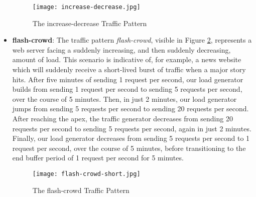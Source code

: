 \begin{itemize}
    \begin{figure}[!h]
      \centerline{\texttt{[image: increase-decrease.jpg]}}
      \caption{The increase-decrease Traffic Pattern}
      \label{fig:increase-decrease}
    \end{figure}

  \item \textbf{flash-crowd}: The traffic pattern \textit{flash-crowd}, visible
    in Figure \ref{fig:flash-crowd}, represents a web server facing a suddenly
    increasing, and then suddenly decreasing, amount of load. This scenario is
    indicative of, for example, a news website which will suddenly receive a
    short-lived burst of traffic when a major story hits. After five minutes of
    sending 1 request per second, our load generator
    builds from sending 1 request per second
    to sending 5 requests per second, over the course of 5 minutes. Then, in
    just 2 minutes, our load generator jumps from sending 5 requests per second
    to sending 20 requests per second. After reaching the apex, the traffic
    generator decreases from sending 20 requests per second to sending 5
    requests per second, again in just 2 minutes. Finally, our load generator
    decreases from sending 5 requests per second to 1 request per second, over
    the course of 5 minutes, before transitioning to the end buffer period of 1
    request per second for 5 minutes.

    \begin{figure}[!h]
      \centerline{\texttt{[image: flash-crowd-short.jpg]}}
      \caption{The flash-crowd Traffic Pattern}
      \label{fig:flash-crowd}
    \end{figure}

\end{itemize}
